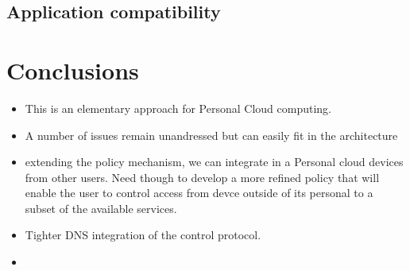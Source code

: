 \subsection{Application compatibility}

\section{Conclusions}\label{sec:signpost-conclusion}

\begin{itemize}
  \item This is an elementary approach for Personal Cloud computing. 
  \item A number of issues remain unandressed but can easily fit in the
        \signpost architecture
  \item extending the policy mechanism, we can integrate in a Personal cloud
        devices from other users. Need though to develop a more refined policy
        that will enable the user to control access from devce outside of its
        personal to a subset of the available services. 
  \item Tighter DNS integration of the control protocol.
  \item 
\end{itemize}
%
%
%


